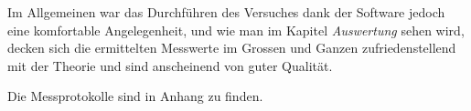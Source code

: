 Im Allgemeinen  war das Durchf\"uhren  des Versuches dank der  Software jedoch
eine  komfortable  Angelegenheit, und  wie  man  im Kapitel  \emph{Auswertung}
sehen  wird, decken  sich  die  ermittelten Messwerte  im  Grossen und  Ganzen
zufriedenstellend mit der Theorie und sind anscheinend von guter Qualit\"at.

Die Messprotokolle sind in Anhang %
zu finden.
